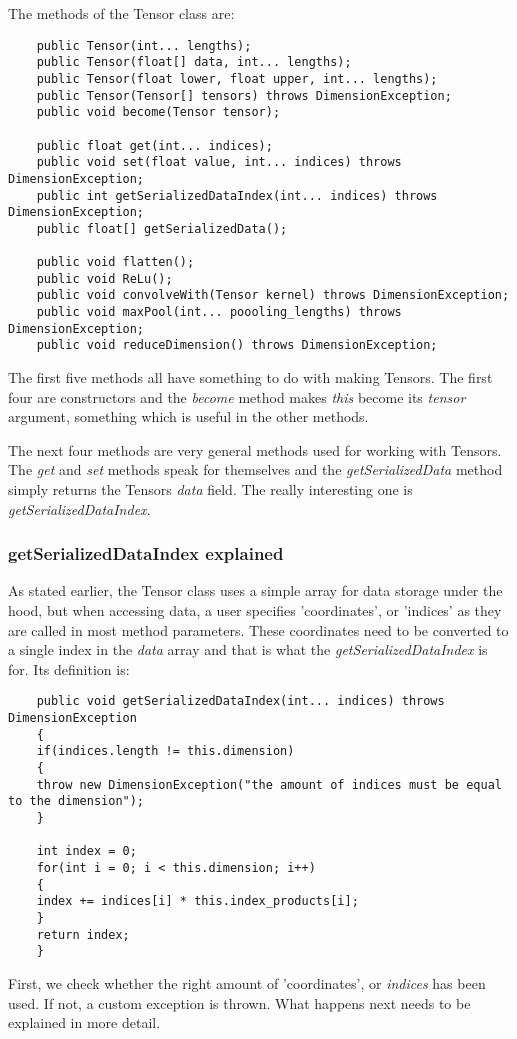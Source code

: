 \documentclass[12pt, titlepage]{article}
\begin{document}
    The methods of the Tensor class are:
    \begin{lstlisting}
    public Tensor(int... lengths);
    public Tensor(float[] data, int... lengths);
    public Tensor(float lower, float upper, int... lengths);
    public Tensor(Tensor[] tensors) throws DimensionException;
    public void become(Tensor tensor);
    
    public float get(int... indices);
    public void set(float value, int... indices) throws DimensionException;
    public int getSerializedDataIndex(int... indices) throws DimensionException;
    public float[] getSerializedData();
    
    public void flatten();
    public void ReLu();
    public void convolveWith(Tensor kernel) throws DimensionException;
    public void maxPool(int... poooling_lengths) throws DimensionException;
    public void reduceDimension() throws DimensionException;
    \end{lstlisting}
    The first five methods all have something to do with making Tensors. The first four are constructors and the \textit{become} method makes \textit{this} become its \textit{tensor} argument, something which is useful in the other methods.
    
    The next four methods are very general methods used for working with Tensors. The \textit{get} and \textit{set} methods speak for themselves and the \textit{getSerializedData} method simply returns the Tensors \textit{data} field. The really interesting one is \textit{getSerializedDataIndex}.
    
    \subsubsection{getSerializedDataIndex explained}
    As stated earlier, the Tensor class uses a simple array for data storage under the hood, but when accessing data, a user specifies 'coordinates', or 'indices' as they are called in most method parameters. These coordinates need to be converted to a single index in the \textit{data} array and that is what the \textit{getSerializedDataIndex} is for. Its definition is:
    \begin{lstlisting}
    public void getSerializedDataIndex(int... indices) throws DimensionException
    {
    if(indices.length != this.dimension)
    {
    throw new DimensionException("the amount of indices must be equal to the dimension");
    }
    
    int index = 0;
    for(int i = 0; i < this.dimension; i++)
    {
    index += indices[i] * this.index_products[i];
    }
    return index;
    }
    \end{lstlisting}
    First, we check whether the right amount of 'coordinates', or \textit{indices} has been used. If not, a custom exception is thrown. What happens next needs to be explained in more detail.
    
\end{document}
